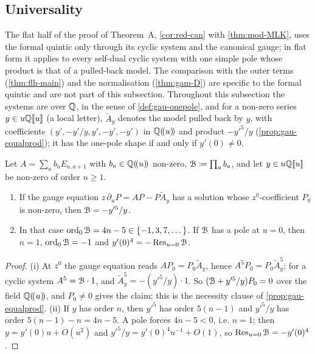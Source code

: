 \subsection{Universality}
\label{sec:mai-univ}

The flat half of the proof of Theorem~A, \cref{cor:red-can} with \cref{thm:mod-MLK}, uses the formal quintic only through its cyclic system and the canonical gauge; in flat form it applies to every self-dual cyclic system with one simple pole whose product is that of a pulled-back model. The comparison with the outer terms (\cref{thm:flh-main}) and the normalisation (\cref{thm:gam-D}) are specific to the formal quintic and are not part of this subsection. Throughout this subsection the systems are over $\mathbb{Q}$, in the sense of \cref{def:gau-onepole}, and for a non-zero series $y\in u\mathbb{Q}[\![ u ]\!]$ (a local letter), $\tilde A_y$ denotes the model pulled back by $y$, with coefficients $(y',-y'/y,y',-y',-y')$ in $\mathbb{Q}(\!(u)\!)$ and product $-y'^5/y$ (\cref{prop:gau-equalprod}); it has the one-pole shape if and only if $y'(0)\neq0$.

\begin{lem}
\label{lem:mai-pole}
Let $A=\sum_ab_aE_{a,a+1}$ with $b_a\in\mathbb{Q}(\!(u)\!)$ non-zero, $\mathcal{B}\coloneqq\prod_ab_a$, and let $y\in u\mathbb{Q}[\![ u ]\!]$ be non-zero of order $n\geq1$.
\begin{enumerate}
\item If the gauge equation $z\,\partial_uP=AP-P\tilde A_y$ has a solution whose $z^0$-coefficient $P_0$ is non-zero, then $\mathcal{B}=-y'^5/y$.
\item In that case $\operatorname{ord}_0\mathcal{B}=4n-5\in\{-1,3,7,\dots\}$. If $\mathcal{B}$ has a pole at $u=0$, then $n=1$, $\operatorname{ord}_0\mathcal{B}=-1$ and $y'(0)^4=-\operatorname*{Res}_{u=0}\mathcal{B}$.
\end{enumerate}
\end{lem}

\begin{proof}
(i) At $z^0$ the gauge equation reads $AP_0=P_0\tilde A_y$, hence $A^5P_0=P_0\tilde A_y^5$; for a cyclic system $A^5=\mathcal{B}\cdot1$, and $\tilde A_y^5=-(y'^5/y)\cdot1$. So $(\mathcal{B}+y'^5/y)P_0=0$ over the field $\mathbb{Q}(\!(u)\!)$, and $P_0\neq0$ gives the claim; this is the necessity clause of \cref{prop:gau-equalprod}. (ii) If $y$ has order $n$, then $y'^5$ has order $5(n-1)$ and $y'^5/y$ has order $5(n-1)-n=4n-5$. A pole forces $4n-5<0$, i.e. $n=1$; then $y=y'(0)u+O(u^2)$ and $y'^5/y=y'(0)^4u^{-1}+O(1)$, so $\operatorname*{Res}_{u=0}\mathcal{B}=-y'(0)^4$.
\end{proof}

